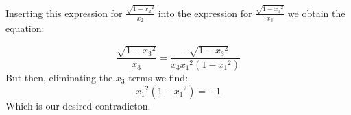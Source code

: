 \documentclass{report}
\begin{document}
Inserting this expression for $\frac{\sqrt{1-{x_2}^2}}{x_2}$ into
the expression for $\frac{\sqrt{1-{x_3}^2}}{x_3}$ we obtain the
equation:

\begin{equation}
\frac{\sqrt{1-{x_3}^2}}{x_3} = \frac{-\sqrt{1-{x_3}^2}}{x_3 {x_1}^2  (1-{x_1}^2)}
\end{equation}
But then, eliminating the $x_3$ terms we find:
\begin{equation}
{x_1}^2 (1-{x_1}^2) = -1
\end{equation}
Which is our desired contradicton.
\end{document}
